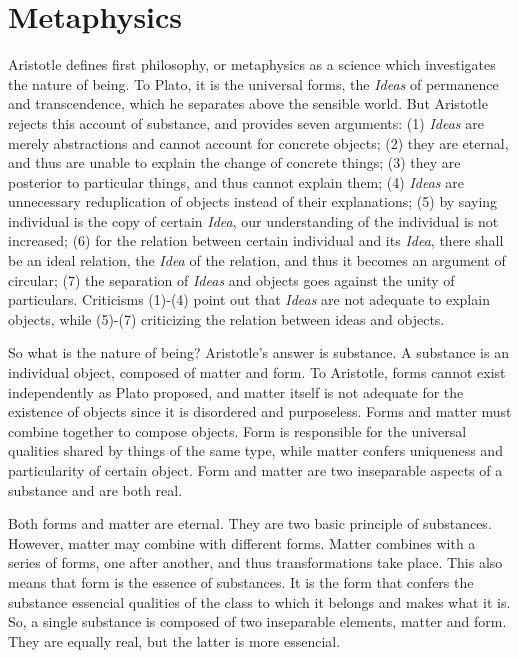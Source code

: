\documentclass[11pt]{article}
\begin{document}
\section{Metaphysics}
Aristotle defines first philosophy, or metaphysics as a science which investigates the nature of being. 
To Plato, it is the universal forms, the \textit{Ideas} of permanence and transcendence, which he separates above the sensible world. 
But Aristotle rejects this account of substance, and provides seven arguments: 
(1) \textit{Ideas} are merely abstractions and cannot account for concrete objects; 
(2) they are eternal, and thus are unable to explain the change of concrete things; 
(3) they are posterior to particular things, and thus cannot explain them; 
(4) \textit{Ideas} are unnecessary reduplication of objects instead of their explanations; 
(5) by saying individual is the copy of certain \textit{Idea}, our understanding of the individual is not increased; 
(6) for the relation between certain individual and its \textit{Idea}, there shall be an ideal relation, the \textit{Idea} of the relation, and thus it becomes an argument of circular; 
(7) the separation of \textit{Ideas} and objects goes against the unity of particulars. 
Criticisms (1)-(4) point out that \textit{Ideas} are not adequate to explain objects, while (5)-(7) criticizing the relation between ideas and objects.

\newline

So what is the nature of being? 
Aristotle’s answer is substance. 
A substance is an individual object, composed of matter and form. 
To Aristotle, forms cannot exist independently as Plato proposed, and matter itself is not adequate for the existence of objects since it is disordered and purposeless. 
Forms and matter must combine together to compose objects. 
Form is responsible for the universal qualities shared by things of the same type, while matter confers uniqueness and particularity of certain object. 
Form and matter are two inseparable aspects of a substance and are both real.

\newline

Both forms and matter are eternal. 
They are two basic principle of substances. 
However, matter may combine with different forms. 
Matter combines with a series of forms, one after another, and thus transformations take place. 
This also means that form is the essence of substances. 
It is the form that confers the substance essencial qualities of the class to which it belongs and makes what it is. 
So, a single substance is composed of two inseparable elements, matter and form. 
They are equally real, but the latter is more essencial.
\end{document}
